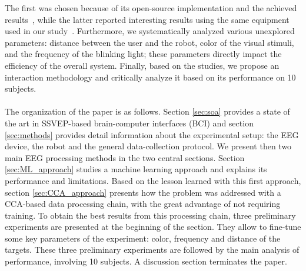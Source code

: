 \documentclass[smallextended]{svjour3}
\begin{document}
The first was chosen because of its open-source implementation and the achieved results~\cite{openvibeSSVEP}, while the latter reported interesting results using the same equipment used in our study~\cite{Lin2014}. 
Furthermore, we systematically analyzed various unexplored parameters: distance between the user and the robot, color of the visual stimuli, and the frequency of the blinking light; these parameters directly impact the efficiency of the overall system. 
Finally, based on the studies, we propose an interaction methodology and critically analyze it based on its performance on 10 subjects.\\
\\
The organization of the paper is as follows. Section \ref{sec:soa} provides a state of the art in SSVEP-based brain-computer interfaces (BCI) and section \ref{sec:methods} provides detail information about the experimental setup: the EEG device, the robot and the general data-collection protocol. 
We present then two main EEG processing methods in the two central sections. Section \ref{sec:ML_approach} studies a machine learning approach and explains its performance and limitations. Based on the lesson learned with this first approach, section \ref{sec:CCA_approach} presents how the problem was addressed with a CCA-based data processing chain, with the great advantage of not requiring training. To obtain the best results from this processing chain, three preliminary experiments are presented at the beginning of the section. They allow to fine-tune some key parameters of the experiment: color, frequency and distance of the targets. These three preliminary experiments are followed by the main analysis of performance, involving 10 subjects. A discussion section terminates the paper.
\end{document}
